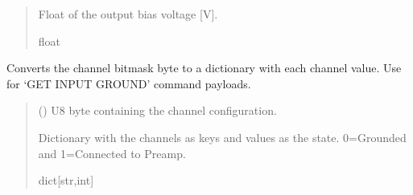 \documentclass[letterpaper,10pt,english]{sphinxmanual}
\begin{document}
\begin{fulllineitems}
\begin{fulllineitems}
\begin{quote}
\begin{description}
\sphinxAtStartPar
Float of the output bias voltage {[}V{]}.

\sphinxAtStartPar
float

\end{description}\end{quote}

\end{fulllineitems}


\begin{fulllineitems}
\label{\detokenize{PodApi.Devices:PodApi.Devices.PodDevice_8401HR.Pod8401HR.DecodeChannelBitmask}}
\pysigstartsignatures
{}
\pysigstopsignatures
\sphinxAtStartPar
Converts the channel bitmask byte to a dictionary with each channel value.         Use for ‘GET INPUT GROUND’ command payloads.
\begin{quote}\begin{description}
\sphinxAtStartPar
{} () \textendash{} U8 byte containing the channel configuration.

\sphinxAtStartPar
Dictionary with the channels as keys and values as the state.                 0=Grounded and 1=Connected to Preamp.

\sphinxAtStartPar
dict{[}str,int{]}

\end{description}\end{quote}

\end{fulllineitems}



\end{fulllineitems}
\end{document}
